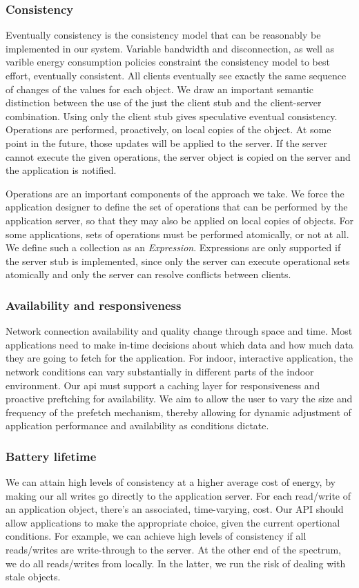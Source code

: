 \subsubsection{Consistency}
Eventually consistency is the consistency model that can be reasonably be implemented in our system.  Variable bandwidth and disconnection,
as well as varible energy consumption policies constraint the consistency model to best effort, eventually consistent.  All clients eventually
 see exactly the same sequence of changes of the values for each object.  We draw an important semantic distinction between the use
 of the just the client stub and the client-server combination.  Using only the client stub gives speculative eventual consistency.
 Operations are performed, proactively, on local copies of the object.  At some point in the future, those updates will be applied
 to the server.  If the server cannot execute the given operations, the server object is copied on the server and the application
 is notified.

 Operations are an important components of the approach we take.  We force the application designer to define the set of operations
 that can be performed by the application server, so that they may also be applied on local copies of objects.  For some applications, 
 sets of operations must be performed atomically, or not at all.  We define such a collection as an \emph{Expression}.  Expressions
 are only supported if the server stub is implemented, since only the server can execute operational sets atomically and
 only the server can resolve conflicts between clients.

\subsubsection{Availability and responsiveness}
Network connection availability and quality change through space and time. Most applications need to make in-time decisions about which
data and how much data they are going to fetch for the application.  For indoor, interactive application, the network conditions can
vary substantially in different parts of the indoor environment.  Our api must support a caching layer for responsiveness and
proactive preftching for availability.  We aim to allow the user to vary the size and frequency of the prefetch mechanism, thereby
allowing for dynamic adjustment of application performance and availability as conditions dictate.

\subsubsection{Battery lifetime}
We can attain high levels of consistency at a higher average cost of energy, by making our all writes go directly to the application server.
For each read/write of an application object, there's an associated, time-varying, cost.  Our API should allow applications to make the 
appropriate choice, given the current opertional conditions.  For example, we can achieve high levels of consistency if all reads/writes are
write-through to the server.  At the other end of the spectrum, we do all reads/writes from locally.  In the latter, we run the risk
of dealing with stale objects.


